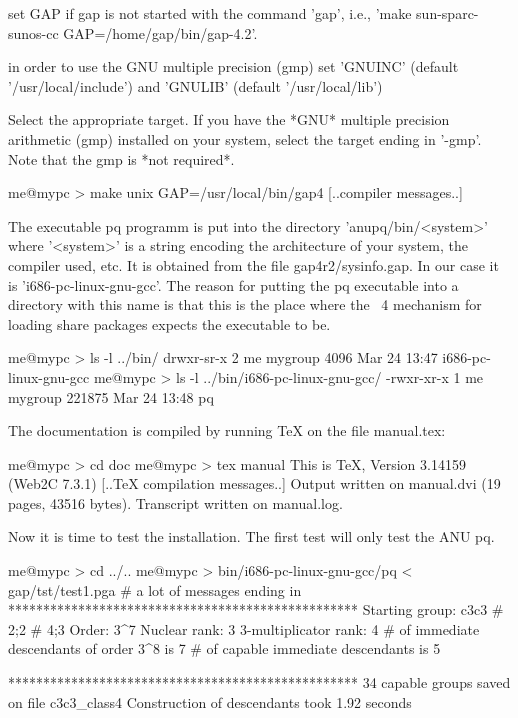    set GAP if gap is not started with the command 'gap',
   i.e., 'make sun-sparc-sunos-cc GAP=/home/gap/bin/gap-4.2'.

   in order to use the GNU multiple precision (gmp) set
   'GNUINC' (default '/usr/local/include') and 
   'GNULIB' (default '/usr/local/lib')
\endtt

Select the appropriate target.  If  you have the *GNU* multiple precision
arithmetic (gmp)  installed on your  system, select the target  ending in
'-gmp'.  Note that  the gmp  is  *not required*.

\begintt
    me@mypc > make unix GAP=/usr/local/bin/gap4
    [..compiler messages..]
\endtt

The executable pq programm is put into the directory 'anupq/bin/<system>'
where '<system>'  is a string  encoding the architecture of  your system,
the compiler used, etc.  It is obtained from the file gap4r2/sysinfo.gap.
In our case it is 'i686-pc-linux-gnu-gcc'.  The reason for putting the pq
executable into  a directory  with this  name is that  this is  the place
where  the {\GAP}~4  mechanism  for loading  share  packages expects  the
executable to be.

\begintt
    me@mypc > ls -l ../bin/                      
    drwxr-sr-x    2 me   mygroup   4096 Mar 24 13:47 i686-pc-linux-gnu-gcc
    me@mypc > ls -l ../bin/i686-pc-linux-gnu-gcc/
    -rwxr-xr-x    1 me   mygroup 221875 Mar 24 13:48 pq
\endtt

The  {\GAP} documentation  is  compiled  by running  {\TeX}  on the  file
manual.tex:

\begintt
    me@mypc > cd doc
    me@mypc > tex manual
    This is TeX, Version 3.14159 (Web2C 7.3.1)
    [..TeX compilation messages..]
    Output written on manual.dvi (19 pages, 43516 bytes).
    Transcript written on manual.log.
\endtt


Now it is time to test  the installation.  The  first test will only test
the ANU pq.

\begintt
    me@mypc > cd ../..
    me@mypc > bin/i686-pc-linux-gnu-gcc/pq < gap/tst/test1.pga
    # a lot of messages ending in
    **************************************************
    Starting group: c3c3 # 2;2 # 4;3
    Order: 3^7
    Nuclear rank: 3
    3-multiplicator rank: 4
    # of immediate descendants of order 3^8 is 7
    # of capable immediate descendants is 5

    **************************************************
    34 capable groups saved on file c3c3_class4
    Construction of descendants took 1.92 seconds

